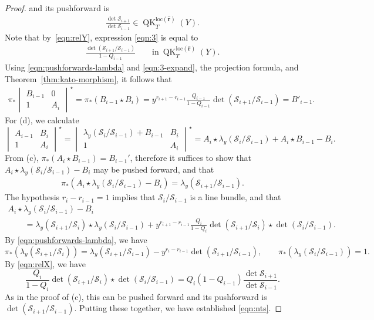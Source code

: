 \documentclass[11pt]{article}
\numberwithin{equation}{section}
\numberwithin{equation}{section}
\theoremstyle{definition}
\DeclareMathOperator{\QK}{QK}
\def\loc{{\mathrm{loc}}}
\newcommand{\cS}{{\mathcal S}}
\begin{document}
\begin{proof}
 and its pushforward is
\begin{gather}\label{eqn:3}
 \frac{\det\cS_{i+1}}{\det\cS_{i-1}}\in \QK_T^{\loc(\mathbf{\hat r})}(Y).
\end{gather}
Note that by~\eqref{eqn:relY},
expression \eqref{eqn:3} is equal to
\begin{gather*}
 \frac{\det\left(\cS_{i+1}/\cS_{i-1}\right)}{1-Q_{i-1}}\qquad \text{in} \ \QK_T^{\loc(\mathbf{\hat r})}(Y).
\end{gather*}
Using \eqref{eqn:pushforwards-lambda} and \eqref{eqn:3-expand}, the projection formula, and Theorem~\ref{thm:kato-morphism}, it follows that
\begin{gather*}
 \pi_*\begin{vmatrix}
 B_{i-1} & 0\\
 1 & A_{i}
 \end{vmatrix}^\star=\pi_*\left(B_{i-1}\star B_i\right)=y^{r_{i+1}-r_{i-1}}\frac{Q_{i-1}}{1-Q_{i-1}}\det\left(\cS_{i+1}/\cS_{i-1}\right)=B'_{i-1}.
\end{gather*}
 For (d), we calculate
 \[ \begin{vmatrix}
 A_{i-1} & B_i\\1 & A_i
 \end{vmatrix}^\star
 = \begin{vmatrix}
 \lambda_y(\cS_{i}/\cS_{i-1}) + B_{i-1} & B_i\\1 & A_i
 \end{vmatrix}^\star
 = A_i \star \lambda_y(\cS_{i}/\cS_{i-1}) + A_i \star B_{i-1} - B_i. \]
 From (c), $\pi_* (A_i \star B_{i-1}) = B_{i-1}'$, therefore it suffices to show that
 $A_i \star \lambda_y(\cS_{i}/\cS_{i-1}) - B_i$ may be pushed forward, and that
 \begin{gather}\label{eqn:nts}
 \pi_*\left(A_i \star \lambda_y(\cS_{i}/\cS_{i-1}) - B_i\right) = \lambda_y(\cS_{i+1}/\cS_{i-1}) .
 \end{gather}
 The hypothesis $r_i - r_{i-1} =1$ implies that $\cS_i/\cS_{i-1}$ is a line bundle, and that
 \begin{gather*}%
 A_i \star \lambda_y(\cS_{i}/\cS_{i-1}) - B_i\\
 \qquad{} = \lambda_y(\cS_{i+1}/\cS_{i}) \star \lambda_y(\cS_{i}/\cS_{i-1})
 + y^{r_{i+1}-r_{i-1}} \frac{Q_i}{1-Q_i} \det (\cS_{i+1}/\cS_{i}) \star \det (\cS_{i}/\cS_{i-1}) .
 \end{gather*}
 By \eqref{eqn:pushforwards-lambda}, we have
 \[
 \pi_*(\lambda_y(\cS_{i+1}/\cS_{i}))=\lambda_y(\cS_{i+1}/\cS_{i-1})-y^{r_i-r_{i-1}}\det(\cS_{i+1}/\cS_{i-1}), \qquad\pi_*(\lambda_y(\cS_{i}/\cS_{i-1}))=1.
 \]
 By \eqref{eqn:relX}, we have
 \[
 \frac{Q_i}{1-Q_i} \det (\cS_{i+1}/\cS_{i}) \star \det (\cS_{i}/\cS_{i-1}) = Q_i(1-Q_{i-1})\frac{\det\cS_{i+1}}{\det \cS_{i-1}}.
 \]
 As in the proof of (c), this can be pushed forward and its pushforward is $\det(\cS_{i+1}/\cS_{i-1})$. Putting these together, we have established \eqref{eqn:nts}.
\end{proof}
\end{document}
